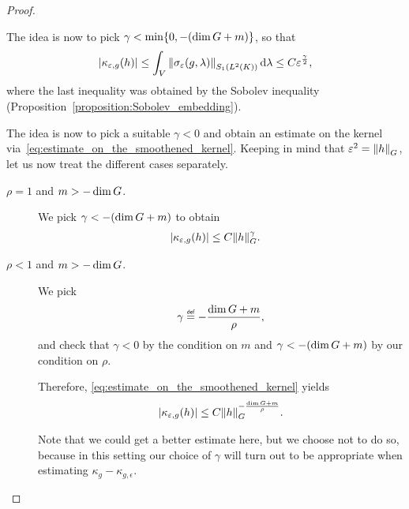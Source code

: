 \begin{proof}
\begin{description}
            The idea is now to pick $\gamma < \min \{0, -(\dim \Group + m)\}$, so that
            \begin{align}
                \abs{\kappa_{\epsilon, g}(h)}
                \leq \int_\VectorSpace \norm [\SchattenClasses 1 {\Lebesgue 2 \CompactGroup}] {\sigma_\epsilon(g, \lambda)} \dd \lambda
                \leq C
                \epsilon^{\frac \gamma 2},
                \label{eq:estimate_on_the_smoothened_kernel}
            \end{align}
            where the last inequality was obtained by the Sobolev inequality (Proposition~\ref{proposition:Sobolev_embedding}).

            The idea is now to pick a suitable $\gamma < 0$ and obtain an estimate on the kernel via~\eqref{eq:estimate_on_the_smoothened_kernel}.
            Keeping in mind that $\epsilon^2 = \norm [\Group] h$,
            let us now treat the different cases separately.
            \begin{description}
                \item[$\rho = 1$ and $m > -\dim \Group$.] We pick $\gamma < -(\dim \Group + m)$ to obtain
                    \begin{align*}
                        \abs {\kappa_{\epsilon, g}(h)}
                        &\leq C \norm [\Group] h^\gamma.
                    \end{align*}
                \item[$\rho < 1$ and $m > -\dim \Group$.]
                    We pick
                    \begin{align*}
                        \gamma \defeq -\frac {\dim \Group + m} \rho,
                    \end{align*}
                    and check that $\gamma < 0$ by the condition on $m$ and
                    $\gamma < -(\dim \Group + m)$ by our condition on $\rho$.

                    Therefore, \eqref{eq:estimate_on_the_smoothened_kernel} yields
                    \begin{align*}
                        \abs {\kappa_{\epsilon, g}(h)}
                        \leq C \norm [\Group] h^{-\frac {\dim \Group + m} {\rho}}.
                    \end{align*}

                    Note that we could get a better estimate here,
                    but we choose not to do so,
                    because in this setting our choice of $\gamma$ will turn out to be appropriate when estimating $\kappa_g - \kappa_{g, \epsilon}$.
            \end{description}


\end{description}
\end{proof}
